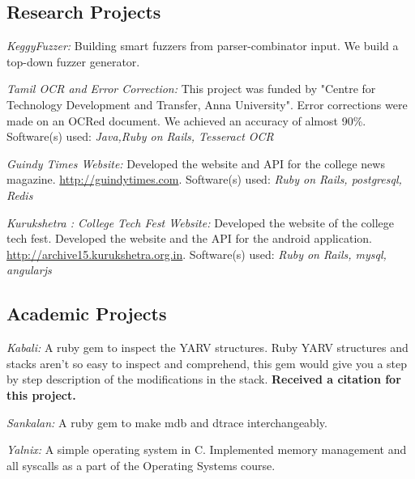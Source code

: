 \documentclass[letterpaper,10pt]{article}
\renewenvironment{itemize}{
  \begin{list}{}{
    \setlength{\leftmargin}{1.5em}
  }
}{
  \end{list}
}
\begin{document}
\subsection*{Research Projects}

\begin{itemize}
\setlength\itemsep{0ex}
\item \textit{KeggyFuzzer:} Building smart fuzzers from parser-combinator input. We build a top-down fuzzer generator.

\item \textit{Tamil OCR and Error Correction:} This project was funded by "Centre for Technology Development and Transfer, Anna University". Error corrections were made on an OCRed document. We achieved an accuracy of almost 90\%. Software(s) used: \textsl{Java,Ruby on Rails, Tesseract OCR}

\item \textit{Guindy Times Website:} Developed the website and API for the college news magazine. \url{http://guindytimes.com}. Software(s) used: \textsl{Ruby on Rails, postgresql, Redis}
\item \textit{Kurukshetra : College Tech Fest Website:} Developed the website of the college tech fest. Developed the website and the API for the android application. \url{http://archive15.kurukshetra.org.in}. Software(s) used: \textsl{Ruby on Rails, mysql, angularjs}
\end{itemize}


\subsection*{Academic Projects}
\begin{itemize}
  \setlength\itemsep{0ex}
  \item \textit{Kabali:} A ruby gem to inspect the YARV structures. Ruby YARV structures and stacks aren't so easy to inspect and comprehend, this gem would give you a step by step description of the modifications in the stack. {\bf Received a citation for this project.}
  \item \textit{Sankalan:} A ruby gem to make mdb and dtrace interchangeably.
  \item \textit{Yalnix:} A simple operating system in C. Implemented memory management and all syscalls as a part of the Operating Systems course.

  \end{itemize}
\end{document}
